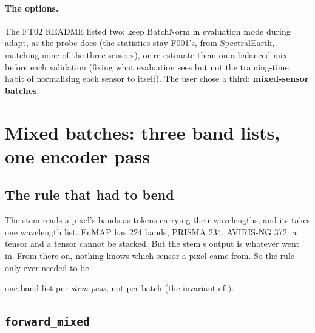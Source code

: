 \paragraph{The options.} The FT02 README listed two: keep BatchNorm in evaluation mode during adapt, as the probe does (the statistics stay F001's, from
SpectralEarth, matching none of the three sensors), or re-estimate them on a balanced mix before each validation (fixing what evaluation sees but not the
training-time habit of normalising each sensor to itself). The user chose a third: \textbf{mixed-sensor batches}.

\section{Mixed batches: three band lists, one encoder pass}\label{sec:finetune:mixed}

\subsection{The rule that had to bend}

The stem reads a pixel's bands as tokens carrying their wavelengths, and its  takes one  wavelength list. EnMAP has 224 bands,
PRISMA 234, AVIRIS-NG 372: a  tensor and a  tensor cannot be stacked. But the stem's output is
 whatever went in. From there on, nothing knows which sensor a pixel came from. So the rule only ever needed to be
\begin{keypoint}
one band list per \emph{stem pass}, not per batch (the invariant of ).
\end{keypoint}

\subsection{\texttt{forward\_mixed}}


